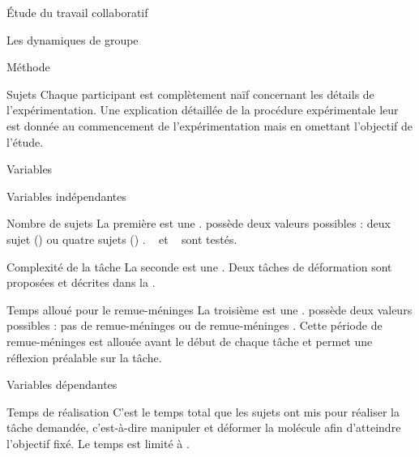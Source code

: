 \documentclass[myfrancais]{mythesis}
\begin{document}
\begin{mypart}{Étude du travail collaboratif}
\begin{mychapter}{Les dynamiques de groupe}
\begin{mysection}{Méthode}
\begin{mysubsection}{Sujets}
					Chaque participant est complètement naïf concernant les détails de l'expérimentation.
					Une explication détaillée de la procédure expérimentale leur est donnée au commencement de l'expérimentation mais en omettant l'objectif de l'étude.
				\end{mysubsection}
				\begin{mysubsection}{Variables}
					\begin{mysubsubsection}{Variables indépendantes}
						\begin{myparagraph}{ Nombre de sujets}
							La première  est une .
							 possède deux valeurs possibles : \og deux sujet (\mycf {}) \fg ou \og quatre sujets (\mycf {}) \fg.
							~ et ~ sont testés.
						\end{myparagraph}
						\begin{myparagraph}{ Complexité de la tâche}
							La seconde  est une .
							Deux tâches de déformation sont proposées et décrites dans la .
						\end{myparagraph}
						\begin{myparagraph}{ Temps alloué pour le remue-méninges}
							La troisième  est une .
							 possède deux valeurs possibles : \og pas de remue-méninges \fg ou \og {} de remue-méninges \fg.
							Cette période de remue-méninges est allouée avant le début de chaque tâche et permet une réflexion préalable sur la tâche.
						\end{myparagraph}
					\end{mysubsubsection}
					\begin{mysubsubsection}{Variables dépendantes}
						\begin{myparagraph}{ Temps de réalisation}
							C'est le temps total que les sujets ont mis pour réaliser la tâche demandée, c'est-à-dire manipuler et déformer la molécule afin d'atteindre l'objectif fixé.
							Le temps est limité à .
						\end{myparagraph}

\end{mysubsubsection}
\end{mysubsection}
\end{mysection}
\end{mychapter}
\end{mypart}
\end{document}
